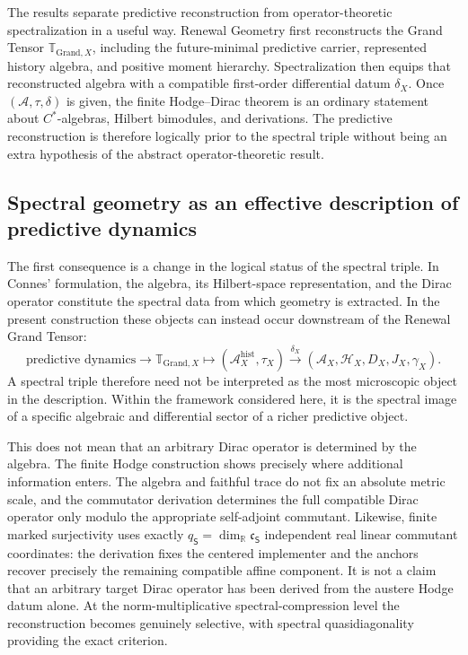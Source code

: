 \documentclass[11pt]{article}
\theoremstyle{definition}
\theoremstyle{remark}
\theoremstyle{definition}
\theoremstyle{remark}
\newcommand{\R}{\mathbb R}
\newcommand{\A}{\mathcal A}
\newcommand{\Hh}{\mathcal H}
\newcommand{\GTX}{\boldsymbol{\mathbb T}_{\mathrm{Grand},X}}
\begin{document}
The results separate predictive reconstruction from operator-theoretic
spectralization in a useful way.  Renewal Geometry first reconstructs the Grand
Tensor $\GTX$, including the future-minimal predictive carrier, represented
history algebra, and positive moment hierarchy.  Spectralization then equips that
reconstructed algebra with a compatible first-order differential datum
$\delta_X$.  Once $(\A,\tau,\delta)$ is given, the finite Hodge--Dirac theorem
is an ordinary statement about $C^*$-algebras, Hilbert bimodules, and derivations.
The predictive reconstruction is therefore logically prior to the spectral
triple without being an extra hypothesis of the abstract operator-theoretic
result.

\subsection{Spectral geometry as an effective description of predictive dynamics}

The first consequence is a change in the logical status of the spectral triple.
In Connes' formulation, the algebra, its Hilbert-space representation, and the
Dirac operator constitute the spectral data from which geometry is extracted.  In
the present construction these objects can instead occur downstream of the
Renewal Grand Tensor:
\begin{equation}
\text{predictive dynamics}
\longrightarrow
\GTX
\longmapsto
(\A_X^{\mathrm{hist}},\tau_X)
\overset{\delta_X}{\longrightarrow}
(\A_X,\Hh_X,D_X,J_X,\gamma_X).
\label{eq:discussion-layered}
\end{equation}
A spectral triple therefore need not be interpreted as the most microscopic
object in the description.  Within the framework considered here, it is the
spectral image of a specific algebraic and differential sector of a richer
predictive object.

This does not mean that an arbitrary Dirac operator is determined by the algebra.
The finite Hodge construction shows precisely where additional information enters.
The algebra and faithful trace do not fix an absolute metric scale, and the
commutator derivation determines the full compatible Dirac operator only modulo
the appropriate self-adjoint commutant.  Likewise, finite marked surjectivity uses exactly
$q_{\mathsf S}=\dim_{\R}\mathfrak c_{\mathsf S}$ independent real linear commutant coordinates:
the derivation fixes the centered implementer and the anchors recover precisely the
remaining compatible affine component.  It is not a claim that an arbitrary target
Dirac operator has been derived from the austere Hodge datum alone.  At the
norm-multiplicative spectral-compression level the reconstruction becomes genuinely selective, with
spectral quasidiagonality providing the exact criterion.
\end{document}
